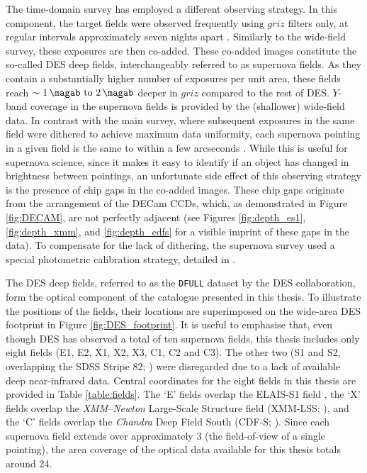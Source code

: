 The time-domain survey has employed a different observing strategy. In this component, the target fields were observed frequently using $griz$ filters only, at regular intervals approximately seven nights apart \citep{2015AJ....150..172K}.  Similarly to the wide-field survey, these exposures are then co-added. These co-added images constitute the so-called DES deep fields, interchangeably referred to as supernova fields. As they contain a substantially higher number of exposures per unit area, these fields reach $\sim\SIrange{1}{2}{\magab}$ deeper in $griz$ compared to the rest of DES. $Y$-band coverage in the supernova fields is provided by the (shallower) wide-field data. In contrast with the main survey, where subsequent exposures in the same field were dithered to achieve maximum data uniformity, each supernova pointing in a given field is the same to within a few arcseconds \citep{2015AJ....150..172K}. While this is useful for supernova science, since it makes it easy to identify if an object has changed in brightness between pointings, an unfortunate side effect of this observing strategy is the presence of chip gaps in the co-added images. These chip gaps originate from the arrangement of the DECam CCDs, which, as demonstrated in Figure \ref{fig:DECAM}, are not perfectly adjacent (see Figures \ref{fig:depth_es1}, \ref{fig:depth_xmm}, and \ref{fig:depth_cdfs} for a visible imprint of these gaps in the data). To compensate for the lack of dithering, the supernova survey used a special photometric calibration strategy, detailed in \cite{2015AJ....150..172K}. \par



The DES deep fields, referred to as the \texttt{DFULL} dataset by the DES collaboration,  form the optical component of the \DESVIDEO catalogue presented in this thesis. To illustrate the positions of the fields, their locations are superimposed on the wide-area DES footprint in Figure \ref{fig:DES_footprint}. It is useful to emphasise that, even though DES has observed a total of ten supernova fields, this thesis includes only eight fields (E1, E2, X1, X2, X3, C1, C2 and C3). The other two (S1 and S2, overlapping the SDSS Stripe 82; \citealt{2007ApJS..172..634A, 2009ApJS..182..543A}) were disregarded due to a lack of available deep near-infrared data. Central coordinates for the eight fields in this thesis are provided in Table \ref{table:fields}. The `E' fields overlap the ELAIS-S1 field \citep{1999MNRAS.305..297G}, the `X' fields overlap the \textit{XMM}–\textit{Newton} Large-Scale Structure field (XMM-LSS; \citealt{2004JCAP...09..011P}), and the `C' fields overlap the \textit{Chandra} Deep Field South (CDF-S; \citealt{2011ApJS..195...10X}). Since each supernova field extends over approximately \SI{3}{\sqdeg} (the field-of-view of a single pointing), the area coverage of the optical data available for this thesis totals around \SI{24}{\sqdeg}. \par






